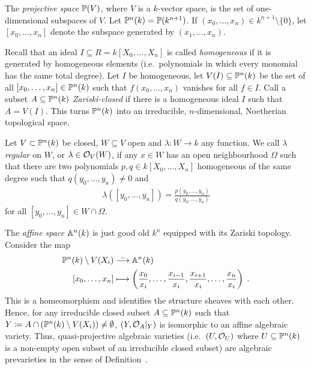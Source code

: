 \documentclass[a4paper,parskip=half,numbers=enddot, DIV=12]{scrreprt}
\begin{document}
	\begin{example}
	    The \emph{projective space} $\mathbb{P}(V)$, where $V$ is a $k$-vector space, is the set of one-dimensional subspaces of $V$. Let $\mathbb{P}^n(k) = \mathbb{P}(k^{n+1})$. If $(x_0,\ldots,x_n)\in k^{n+1}\setminus\{0\}$, let $[x_0,\ldots,x_n]$ denote the subspace generated by $(x_1,\ldots, x_n)$.
	     
	     Recall that an ideal $I\subseteq R=k[X_0,\ldots,X_n]$ is called \emph{homogeneous} if it is generated by homogeneous elements (i.e.\ polynomials in which every monomial has the same total degree). Let $I$ be homogeneous, let $V(I)\subseteq \mathbb{P}^n(k)$ be the set of all $[x_0, \ldots, x_n]\in\mathbb{P}^n(k)$ such that $f(x_0,\ldots, x_n)$ vanishes for all $f\in I$. Call a subset $A\subseteq\mathbb{P}^n(k)$ \emph{Zariski-closed} if there is a homogeneous ideal $I$ such that $A= V(I)$. This turns $\mathbb{P}^n(k)$ into an irreducible, $n$-dimensional, Noetherian topological space.
	     
	     Let $V\subset \mathbb{P}^n(k)$ be closed, $W\subseteq V$ open and $\lambda\colon W\to k$ any function. We call $\lambda$ \emph{regular} on $W$, or $\lambda \in \mathcal{O}_V(W)$, if any $x\in W$ has an open neighbourhood $\Omega$ such that there are two polynomials $p,q\in k[X_0,\ldots,X_n]$ homogeneous of the same degree such that $q(y_0,\ldots,y_n) \neq 0$ and 
	     \begin{align*}
	     	\lambda([y_0,\ldots,y_n]) = \frac{p(y_0,\ldots,y_n)}{q(y_0,\ldots,y_n)}
	     \end{align*}
	     for all $[y_0,\ldots,y_n]\in W\cap \Omega$.
	     
	     The \emph{affine space} $\mathbb{A}^n(k)$ is just good old $k^n$ equipped with its Zariski topology. Consider the map
	     \begin{align*}
	        \IP^n(k)\setminus V(X_i) &\isomorphism \IA^n(k)\\
	        [x_0,\ldots, x_n]&\longmapsto \left(\frac{x_0}{x_i}, \ldots, 
	        \frac{x_{i-1}}{x_i},\frac{x_{i+1}}{x_i},\ldots,\frac{x_n}{x_i}\right)\;.
	    \end{align*}
	    This is a homeomorphism and identifies the structure sheaves with each other. Hence, for any irreducible closed subset $A\subseteq \mathbb{P}^n(k)$ such that $Y\coloneqq A\cap(\mathbb{P}^n(k)\setminus V(X_i)) \neq \emptyset$, $(Y, \mathcal{O}_A|_Y) $ is isomorphic to an affine algebraic variety. Thus, quasi-projective algebraic varieties (i.e.\ $(U,\mathcal{O}_U)$ where $U\subseteq \mathbb{P}^n(k)$ is a non-empty open subset of an irreducible closed subset) are algebraic prevarieties in the sense of Definition~.
\end{example}
\end{document}
